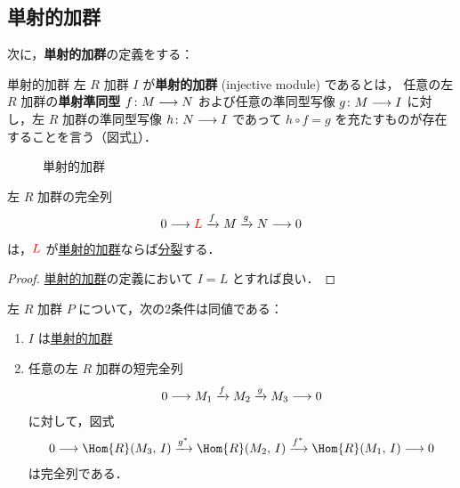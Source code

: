 \documentclass[algtopo_main]{subfiles}
\begin{document}
\subsection{単射的加群}

次に，\textbf{単射的加群}の定義をする：
\begin{mydef}[label=def:inj-mod]{単射的加群}
    左 $R$ 加群 $I$ が\textbf{単射的加群} (injective module) であるとは，
    任意の左 $R$ 加群の\textbf{単射準同型} $f\colon M \longrightarrow N$ および任意の準同型写像 $g \colon M \longrightarrow I$ に対し，左 $R$ 加群の準同型写像 $ h \colon N \longrightarrow I$ であって $ h \circ f = g$ を充たすものが存在することを言う（図式\ref{fig:inj-mod}）．
\end{mydef}

\begin{figure}[H]
    \centering
    \caption{単射的加群}
    \label{fig:inj-mod}
\end{figure}%

\begin{myprop}[label=prop:inj-mod-split]{}
    左 $R$ 加群の完全列
    \begin{align}
        0 \longrightarrow \textcolor{red}{L}\xrightarrow{f} M \xrightarrow{g} N \longrightarrow 0
    \end{align}
    は，$\textcolor{red}{L}$ が\hyperref[def:inj-mod]{単射的加群}ならば\hyperref[def:split]{分裂}する．
\end{myprop}

\begin{proof}
    \hyperref[def:inj-mod]{単射的加群}の定義において $I = L$ とすれば良い．
\end{proof}


\begin{myprop}[label=prop:inj-mod-basic]{}
    左 $R$ 加群 $P$ について，次の2条件は同値である：
    \begin{enumerate}
        \item $I$ は\hyperref[def:inj-mod]{単射的加群}
        \item 任意の左 $R$ 加群の短完全列
        \begin{align}
            0 \longrightarrow M_1 \xrightarrow{f} M_2 \xrightarrow{g} M_3 \longrightarrow 0
        \end{align}
        に対して，図式
        \begin{align}
            \label{eq:prop-proj-hom}
            0 \lto \Hom{R} (M_3,\, I) \xrightarrow{g^*} \Hom{R}(M_2,\, I) \xrightarrow{f^*} \Hom{R}(M_1,\, I) \lto 0
        \end{align}
        は完全列である．
    \end{enumerate}
\end{myprop}
\end{document}
